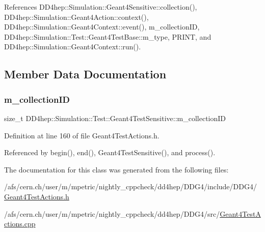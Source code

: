 References D\+D4hep\+::\+Simulation\+::\+Geant4\+Sensitive\+::collection(), D\+D4hep\+::\+Simulation\+::\+Geant4\+Action\+::context(), D\+D4hep\+::\+Simulation\+::\+Geant4\+Context\+::event(), m\+\_\+collection\+ID, D\+D4hep\+::\+Simulation\+::\+Test\+::\+Geant4\+Test\+Base\+::m\+\_\+type, P\+R\+I\+NT, and D\+D4hep\+::\+Simulation\+::\+Geant4\+Context\+::run().



\subsection{Member Data Documentation}
\hypertarget{class_d_d4hep_1_1_simulation_1_1_test_1_1_geant4_test_sensitive_a2b6048929e3f19fbe4e2f9eb4fe8e77a}{}\label{class_d_d4hep_1_1_simulation_1_1_test_1_1_geant4_test_sensitive_a2b6048929e3f19fbe4e2f9eb4fe8e77a} 
\subsubsection{\texorpdfstring{m\+\_\+collection\+ID}{m\_collectionID}}
{\footnotesize\ttfamily size\+\_\+t D\+D4hep\+::\+Simulation\+::\+Test\+::\+Geant4\+Test\+Sensitive\+::m\+\_\+collection\+ID\hspace{0.3cm}{\ttfamily [protected]}}



Definition at line 160 of file Geant4\+Test\+Actions.\+h.



Referenced by begin(), end(), Geant4\+Test\+Sensitive(), and process().



The documentation for this class was generated from the following files\+:\begin{DoxyCompactItemize}
\item 
/afs/cern.\+ch/user/m/mpetric/nightly\+\_\+cppcheck/dd4hep/\+D\+D\+G4/include/\+D\+D\+G4/\hyperlink{_geant4_test_actions_8h}{Geant4\+Test\+Actions.\+h}\item 
/afs/cern.\+ch/user/m/mpetric/nightly\+\_\+cppcheck/dd4hep/\+D\+D\+G4/src/\hyperlink{_geant4_test_actions_8cpp}{Geant4\+Test\+Actions.\+cpp}\end{DoxyCompactItemize}

